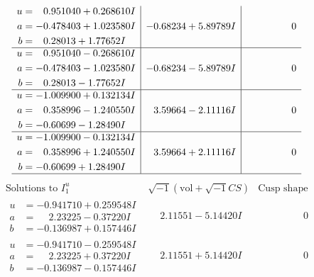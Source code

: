 \documentclass[1p]{elsarticle_modified}
\theoremstyle{definition}
\newcommand{\I}{\sqrt{-1}}
\begin{document}
$$\begin{array}{c|c|c}
\begin{aligned}
u &= \phantom{-}0.951040 + 0.268610 I \\
a &= -0.478403 + 1.023580 I \\
b &= \phantom{-}0.28013 + 1.77652 I\end{aligned}
 & -0.68234 + 5.89789 I & \phantom{-0.000000 } 0 \\ \hline\begin{aligned}
u &= \phantom{-}0.951040 - 0.268610 I \\
a &= -0.478403 - 1.023580 I \\
b &= \phantom{-}0.28013 - 1.77652 I\end{aligned}
 & -0.68234 - 5.89789 I & \phantom{-0.000000 } 0 \\ \hline\begin{aligned}
u &= -1.009900 + 0.132134 I \\
a &= \phantom{-}0.358996 - 1.240550 I \\
b &= -0.60699 - 1.28490 I\end{aligned}
 & \phantom{-}3.59664 - 2.11116 I & \phantom{-0.000000 } 0 \\ \hline\begin{aligned}
u &= -1.009900 - 0.132134 I \\
a &= \phantom{-}0.358996 + 1.240550 I \\
b &= -0.60699 + 1.28490 I\end{aligned}
 & \phantom{-}3.59664 + 2.11116 I & \phantom{-0.000000 } 0\\
 \hline 
 \end{array}$$\newpage$$\begin{array}{c|c|c}  
\text{Solutions to }I^u_{1}& \I (\text{vol} + \sqrt{-1}CS) & \text{Cusp shape}\\
 \hline 
\begin{aligned}
u &= -0.941710 + 0.259548 I \\
a &= \phantom{-}2.23225 - 0.37220 I \\
b &= -0.136987 + 0.157446 I\end{aligned}
 & \phantom{-}2.11551 - 5.14420 I & \phantom{-0.000000 } 0 \\ \hline\begin{aligned}
u &= -0.941710 - 0.259548 I \\
a &= \phantom{-}2.23225 + 0.37220 I \\
b &= -0.136987 - 0.157446 I\end{aligned}
 & \phantom{-}2.11551 + 5.14420 I & \phantom{-0.000000 } 0 \\ \hline\begin{aligned}

\end{aligned}
\end{array}$$
\end{document}
